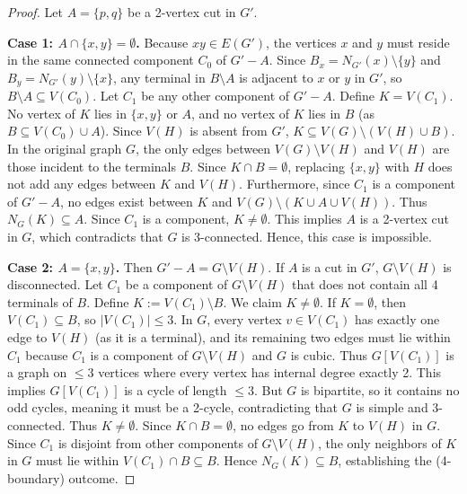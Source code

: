 \documentclass[12pt]{article}
\begin{document}
\begin{proof}
Let $A=\{p,q\}$ be a 2-vertex cut in $G'$.

\textbf{Case 1: $A \cap \{x,y\} = \emptyset$.}
Because $xy \in E(G')$, the vertices $x$ and $y$ must reside in the same connected component $C_0$ of $G'-A$.
Since $B_x = N_{G'}(x) \setminus \{y\}$ and $B_y = N_{G'}(y) \setminus \{x\}$, any terminal in $B \setminus A$ is adjacent to $x$ or $y$ in $G'$, so $B \setminus A \subseteq V(C_0)$.
Let $C_1$ be any other component of $G'-A$.
Define $K = V(C_1)$. No vertex of $K$ lies in $\{x,y\}$ or $A$, and no vertex of $K$ lies in $B$ (as $B \subseteq V(C_0) \cup A$). Since $V(H)$ is absent from $G'$, $K \subseteq V(G) \setminus (V(H) \cup B)$.
In the original graph $G$, the only edges between $V(G) \setminus V(H)$ and $V(H)$ are those incident to the terminals $B$. Since $K \cap B = \emptyset$, replacing $\{x,y\}$ with $H$ does not add any edges between $K$ and $V(H)$. Furthermore, since $C_1$ is a component of $G'-A$, no edges exist between $K$ and $V(G) \setminus (K \cup A \cup V(H))$. Thus $N_G(K) \subseteq A$. Since $C_1$ is a component, $K \neq \emptyset$. This implies $A$ is a 2-vertex cut in $G$, which contradicts that $G$ is 3-connected. Hence, this case is impossible.

\textbf{Case 2: $A = \{x,y\}$.}
Then $G'-A = G \setminus V(H)$. If $A$ is a cut in $G'$, $G \setminus V(H)$ is disconnected.
Let $C_1$ be a component of $G \setminus V(H)$ that does not contain all 4 terminals of $B$.
Define $K := V(C_1) \setminus B$. We claim $K \neq \emptyset$.
If $K = \emptyset$, then $V(C_1) \subseteq B$, so $|V(C_1)| \le 3$. In $G$, every vertex $v \in V(C_1)$ has exactly one edge to $V(H)$ (as it is a terminal), and its remaining two edges must lie within $C_1$ because $C_1$ is a component of $G \setminus V(H)$ and $G$ is cubic. Thus $G[V(C_1)]$ is a graph on $\le 3$ vertices where every vertex has internal degree exactly 2. This implies $G[V(C_1)]$ is a cycle of length $\le 3$. But $G$ is bipartite, so it contains no odd cycles, meaning it must be a 2-cycle, contradicting that $G$ is simple and 3-connected. Thus $K \neq \emptyset$.
Since $K \cap B = \emptyset$, no edges go from $K$ to $V(H)$ in $G$. Since $C_1$ is disjoint from other components of $G \setminus V(H)$, the only neighbors of $K$ in $G$ must lie within $V(C_1) \cap B \subseteq B$. Hence $N_G(K) \subseteq B$, establishing the (4-boundary) outcome.


\end{proof}
\end{document}
